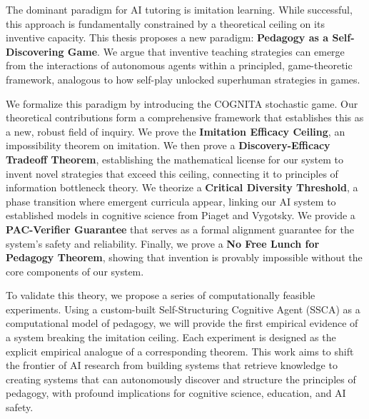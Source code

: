 \noindent The dominant paradigm for AI tutoring is imitation learning. While successful, this approach is fundamentally constrained by a theoretical ceiling on its inventive capacity. This thesis proposes a new paradigm: \textbf{Pedagogy as a Self-Discovering Game}. We argue that inventive teaching strategies can emerge from the interactions of autonomous agents within a principled, game-theoretic framework, analogous to how self-play unlocked superhuman strategies in games.

We formalize this paradigm by introducing the COGNITA stochastic game. Our theoretical contributions form a comprehensive framework that establishes this as a new, robust field of inquiry. We prove the \textbf{Imitation Efficacy Ceiling}, an impossibility theorem on imitation. We then prove a \textbf{Discovery-Efficacy Tradeoff Theorem}, establishing the mathematical license for our system to invent novel strategies that exceed this ceiling, connecting it to principles of information bottleneck theory. We theorize a \textbf{Critical Diversity Threshold}, a phase transition where emergent curricula appear, linking our AI system to established models in cognitive science from Piaget and Vygotsky. We provide a \textbf{PAC-Verifier Guarantee} that serves as a formal alignment guarantee for the system's safety and reliability. Finally, we prove a \textbf{No Free Lunch for Pedagogy Theorem}, showing that invention is provably impossible without the core components of our system.

To validate this theory, we propose a series of computationally feasible experiments. Using a custom-built Self-Structuring Cognitive Agent (SSCA) as a computational model of pedagogy, we will provide the first empirical evidence of a system breaking the imitation ceiling. Each experiment is designed as the explicit empirical analogue of a corresponding theorem. This work aims to shift the frontier of AI research from building systems that retrieve knowledge to creating systems that can autonomously discover and structure the principles of pedagogy, with profound implications for cognitive science, education, and AI safety.